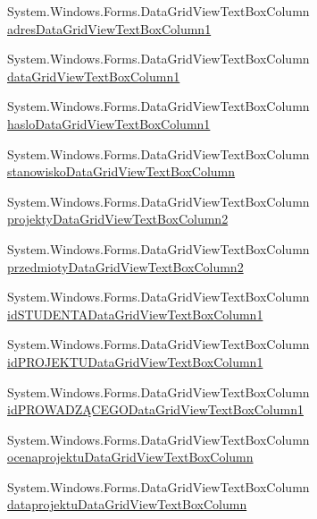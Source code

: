 \begin{DoxyCompactItemize}
\item 
System.\+Windows.\+Forms.\+Data\+Grid\+View\+Text\+Box\+Column \hyperlink{class_dziennik_ocen_1_1_form_admin_a1ab2395ad14f3e0ff677a5d1bc44a6cc}{adres\+Data\+Grid\+View\+Text\+Box\+Column1}
\item 
System.\+Windows.\+Forms.\+Data\+Grid\+View\+Text\+Box\+Column \hyperlink{class_dziennik_ocen_1_1_form_admin_a7b9bbbd7c6bb6feef518a46ac79e5da5}{data\+Grid\+View\+Text\+Box\+Column1}
\item 
System.\+Windows.\+Forms.\+Data\+Grid\+View\+Text\+Box\+Column \hyperlink{class_dziennik_ocen_1_1_form_admin_a8864db3ba24c0e8c5b6d6aa3a1278601}{haslo\+Data\+Grid\+View\+Text\+Box\+Column1}
\item 
System.\+Windows.\+Forms.\+Data\+Grid\+View\+Text\+Box\+Column \hyperlink{class_dziennik_ocen_1_1_form_admin_a2b1066cdc430cd7724666a0a95101a3c}{stanowisko\+Data\+Grid\+View\+Text\+Box\+Column}
\item 
System.\+Windows.\+Forms.\+Data\+Grid\+View\+Text\+Box\+Column \hyperlink{class_dziennik_ocen_1_1_form_admin_ad8c0bca7b6b119720ec43f183c252098}{projekty\+Data\+Grid\+View\+Text\+Box\+Column2}
\item 
System.\+Windows.\+Forms.\+Data\+Grid\+View\+Text\+Box\+Column \hyperlink{class_dziennik_ocen_1_1_form_admin_a764a027534438bf1f2f777a31e904eb6}{przedmioty\+Data\+Grid\+View\+Text\+Box\+Column2}
\item 
System.\+Windows.\+Forms.\+Data\+Grid\+View\+Text\+Box\+Column \hyperlink{class_dziennik_ocen_1_1_form_admin_a43f85f7570d8f173c58c95cd8096ec83}{id\+S\+T\+U\+D\+E\+N\+T\+A\+Data\+Grid\+View\+Text\+Box\+Column1}
\item 
System.\+Windows.\+Forms.\+Data\+Grid\+View\+Text\+Box\+Column \hyperlink{class_dziennik_ocen_1_1_form_admin_aa0b03d605064fd0226fbd650ab4d2194}{id\+P\+R\+O\+J\+E\+K\+T\+U\+Data\+Grid\+View\+Text\+Box\+Column1}
\item 
System.\+Windows.\+Forms.\+Data\+Grid\+View\+Text\+Box\+Column \hyperlink{class_dziennik_ocen_1_1_form_admin_abade19cddc1e6c43a13de0d126e3ca62}{id\+P\+R\+O\+W\+A\+D\+ZĄ\+C\+E\+G\+O\+Data\+Grid\+View\+Text\+Box\+Column1}
\item 
System.\+Windows.\+Forms.\+Data\+Grid\+View\+Text\+Box\+Column \hyperlink{class_dziennik_ocen_1_1_form_admin_a3fb6f3b8f64792f8555efcfb1046d437}{ocenaprojektu\+Data\+Grid\+View\+Text\+Box\+Column}
\item 
System.\+Windows.\+Forms.\+Data\+Grid\+View\+Text\+Box\+Column \hyperlink{class_dziennik_ocen_1_1_form_admin_a43c82d7a21405323bffbfb18b098d8be}{dataprojektu\+Data\+Grid\+View\+Text\+Box\+Column}

\end{DoxyCompactItemize}
